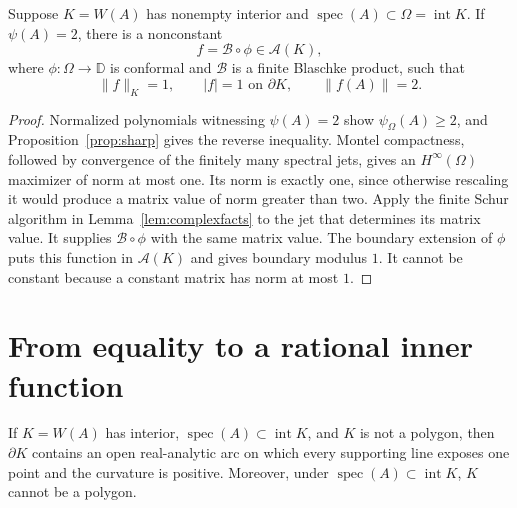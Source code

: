 \documentclass[preprints,article,submit,oneauthor]{Definitions/mdpi}
\numberwithin{equation}{section}
\newcommand{\D}{\mathbb D}
\newcommand{\spec}{\operatorname{spec}}
\newcommand{\Int}{\operatorname{int}}
\begin{document}
\begin{Lemma}\label{lem:extremizer}
Suppose \(K=W(A)\) has nonempty interior and
\(\spec(A)\subset\Omega=\Int K\).  If \(\psi(A)=2\), there is a nonconstant
\[
 f=\mathcal B\circ\phi\in\mathcal A(K),
\]
where \(\phi:\Omega\to\D\) is conformal and \(\mathcal B\) is a finite
Blaschke product,
such that
\[
 \|f\|_K=1,\qquad |f|=1\text{ on }\partial K,\qquad
 \|f(A)\|=2.                                          \tag{4.6}
\]
\end{Lemma}

\begin{proof}
Normalized polynomials witnessing \(\psi(A)=2\) show
\(\psi_\Omega(A)\geq2\), and Proposition~\ref{prop:sharp} gives the reverse
inequality.  Montel compactness, followed by convergence of the finitely many
spectral jets, gives an \(H^\infty(\Omega)\) maximizer of norm at most one.  Its
norm is exactly one, since otherwise rescaling it would produce a matrix value
of norm greater than two.  Apply the
finite Schur algorithm in Lemma~\ref{lem:complexfacts} to the jet that
determines its matrix value.  It supplies \(\mathcal B\circ\phi\) with the same matrix
value.  The boundary extension of \(\phi\) puts this function in \(\mathcal A(K)\) and
gives boundary modulus \(1\).  It cannot be constant because a constant matrix
has norm at most \(1\).
\end{proof}

\section{From equality to a rational inner function}

\begin{Lemma}\label{lem:arc}
If \(K=W(A)\) has interior, \(\spec(A)\subset\Int K\), and \(K\) is not a
polygon, then \(\partial K\) contains an open real-analytic arc on which every
supporting line exposes one point and the curvature is positive.
Moreover, under \(\spec(A)\subset\Int K\), \(K\) cannot be a polygon.
\end{Lemma}
\end{document}
